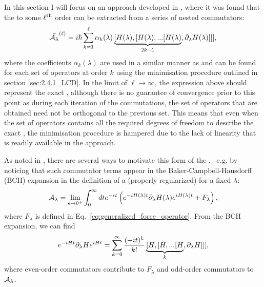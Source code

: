     In this section I will focus on an approach developed in \cite{claeys_floquet-engineering_2019}, where it was found that the  to some $\ell^{\rm th}$ order can be extracted from a series of nested commutators:
    \begin{equation}\label{eq:nested_commutator_AGP}
        \Bar{\mathcal{A}_{\lambda}}^{(\ell)} = i\hbar \sum_{k=1}^\ell \alpha_k(\lambda) \underbrace{[H(\lambda),[H(\lambda),...[H(\lambda)}_{2k-1},\partial_{\lambda} H(\lambda)]]],
    \end{equation}
    where the coefficients $\alpha_k(\lambda)$ are used in a similar manner as  and can be found for each set of operators at order $k$ using the minimisation procedure outlined in section \ref{sec:2.4.1_LCD}. In the limit of $\ell \rightarrow \infty$, the expression above should represent the exact , although there is no guarantee of convergence prior to this point as during each iteration of the commutations, the set of operators that are obtained need not be orthogonal to the previous set. This means that even when the set of operators contains all the required degrees of freedom to describe the exact , the minimisation procedure is hampered due to the lack of linearity that is readily available in the  approach.

    As noted in \cite{claeys_floquet-engineering_2019}, there are several ways to motivate this form of the , \@~e.g. by noticing that such commutator terms appear in the Baker-Campbell-Hausdorff (BCH) expansion in the definition of a (properly regularized) \cite{jarzynski_geometric_1995}  for a fixed $\lambda$:
    \begin{equation}\label{eq:regularised_AGP}
        \mathcal{A}_{\lambda} = \lim_{\epsilon \rightarrow 0^{+}} \int_0^{\infty} dt e^{-\epsilon t} \left( e^{-iH(\lambda) t}\partial_{\lambda} H(\lambda)e^{iH(\lambda) t} + F_{\lambda} \right),
    \end{equation}
    where $F_{\lambda}$ is defined in Eq.~\eqref{eq:generalized_force_operator}. From the BCH expansion, we can find
    \begin{equation}
        e^{-iH t}\partial_{\lambda} H e^{iH t} = \sum_{k = 0}^{\infty} \frac{(-it)^k}{k!} \underbrace{[H,[H,...[H}_{k},\partial_{\lambda} H]]],
    \end{equation}
    where even-order commutators contribute to $F_{\lambda}$ and odd-order commutators to $\mathcal{A}_{\lambda}$.
    
